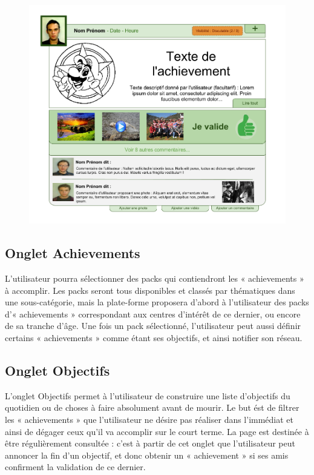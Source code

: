 \documentclass{life-fr}
\begin{document}
\begin{figure}[H]
  \begin{center}
    \includegraphics[width=15cm]{img/achievement.png}
  \end{center}
\end{figure}

\subsection{Onglet Achievements}

L'utilisateur pourra sélectionner des packs qui contiendront les « achievements » à accomplir. Les packs seront tous disponibles et classés par thématiques dans une sous-catégorie, mais la plate-forme proposera d'abord à l'utilisateur des packs d'« achievements » correspondant aux centres d'intérêt de ce dernier, ou encore de sa tranche d'âge. Une fois un pack sélectionné, l'utilisateur peut aussi définir certains « achievements » comme étant ses objectifs, et ainsi notifier son réseau.

\subsection{Onglet Objectifs}

L'onglet Objectifs permet à l'utilisateur de construire une liste d'objectifs du quotidien ou de choses à faire absolument avant de mourir. Le but ést de filtrer les « achievements » que l'utilisateur ne désire pas réaliser dans l'immédiat et ainsi de dégager ceux qu'il va accomplir sur le court terme. La page est destinée à être régulièrement consultée : c'est à partir de cet onglet que l'utilisateur peut annoncer la fin d'un objectif, et donc obtenir un « achievement » si ses amis confirment la validation de ce dernier.
\end{document}
